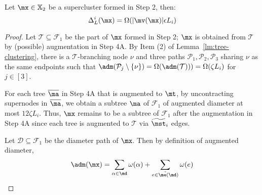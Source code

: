 \begin{lemma}\label{lm:Step2ClusterOracle}
	Let $\mx \in \mathbb{X}_2 $ be a supercluster formed in  Step 2, then:
	\begin{equation*}
	\Delta^i_{L}(\mx) = \Omega(|\mv(\mx)|\epsilon L_i)  
	\end{equation*}
\end{lemma}
\begin{proof} 	Let $\mathcal{T}\subseteq \mathcal{F}_1$ be the part of $\mx$ formed in Step 2;  $\mx$ is obtained from $\mathcal{T}$ by (possible) augmentation in Step 4A. By Item (2) of Lemma~\ref{lm:tree-clustering}, there is a $\mathcal{T}$-branching node $\nu$ and three paths $\mathcal{P}_1,\mathcal{P}_2,\mathcal{P}_3$ sharing $\nu$ as the same endpoints such that $\adm(\mathcal{P}_j\setminus \{\nu\}) = \Omega(\adm(\mathcal{T}))) = \Omega(\zeta L_i)$ for $j \in [3]$.
	
	For each tree $\overline{\ma}$ in Step 4A that is augmented to $\mt$, by uncontracting supernodes in $\overline{\ma}$, we obtain a subtree $\ma$ of $\mathcal{F}_1$ of augmented diameter at most $12\zeta L_i$. Thus, $\mx$ remains to be a subtree of $\mathcal{F}_1$ after the augmentation in Step 4A since each tree is augmented to $\mathcal{T}$ via $\widetilde{\mst}_i$ edges. 
	
	Let $\mathcal{D}\subseteq \mathcal{F}_1$ be the diameter path of $\mx$. Then by definition of augmented diameter, 
	\begin{equation*}
	\adm(\mx)  = \sum_{\alpha \in \md}\omega(\alpha) + \sum_{\tilde{e \in \me(\md) }} \omega(e)
	\end{equation*}
	

\end{proof}
